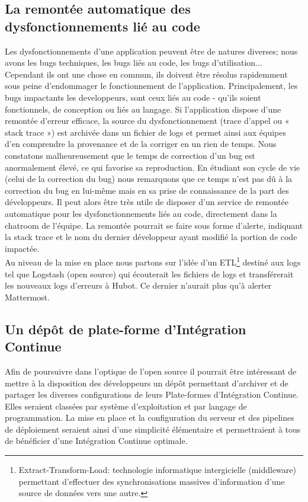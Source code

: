       \subsection{La remontée automatique des dysfonctionnements lié au code}
      Les dysfonctionnements d'une application peuvent être de natures diverses; nous avons les bugs techniques, les bugs liés au code, les bugs d'utilisation... Cependant ils ont une chose en commun, ils doivent être résolus rapidemment sous peine d'endommager le fonctionnement de l'application. Principalement, les bugs impactants les developpeurs, sont ceux liés au code - qu'ils soient fonctionnels, de conception ou liés au langage. Si l'application dispose d'une remontée d'erreur efficace, la source du dysfonctionnement (trace d'appel ou « \gls{stack trace} ») est archivée dans un fichier de logs et permet ainsi aux équipes d'en comprendre la provenance et de la corriger en un rien de temps. Nous constatons malheureusement que le temps de correction d'un bug est anormalement élevé, ce qui favorise sa reproduction. En étudiant son cycle de vie (celui de la correction du bug) nous remarquons que ce temps n'est pas dû à la correction du bug en lui-même mais en sa prise de connaissance de la part des développeurs. Il peut alors être très utile de disposer d'un service de remontée automatique pour les dysfonctionnements liés au code, directement dans la chatroom de l'équipe. La remontée pourrait se faire sous forme d'alerte, indiquant la stack trace et le nom du dernier développeur ayant modifié la portion de code impactée.\\

      Au niveau de la mise en place nous partons sur l'idée d'un \gls{ETL}\footnote{Extract-Transform-Load: technologie informatique intergicielle (middleware) permettant d'effectuer des synchronisations massives d'information d'une source de données vers une autre.} destiné aux logs tel que Logstash (open source) qui écouterait les fichiers de logs et transférerait les nouveaux logs d'erreurs à Hubot. Ce dernier n'aurait plus qu'à alerter Mattermost.

      \subsection{Un dépôt de plate-forme d'Intégration Continue}
      Afin de poursuivre dans l'optique de l'open source il pourrait être intéressant de mettre à la disposition des développeurs un dépôt permettant d'archiver et de partager les diverses configurations de leurs Plate-formes d'Intégration Continue. Elles seraient classées par système d'exploitation et par langage de programmation. La mise en place et la configuration du serveur et des pipelines de déploiement seraient ainsi d'une simplicité élémentaire et permettraient à tous de bénéficier d'une Intégration Continue optimale.
